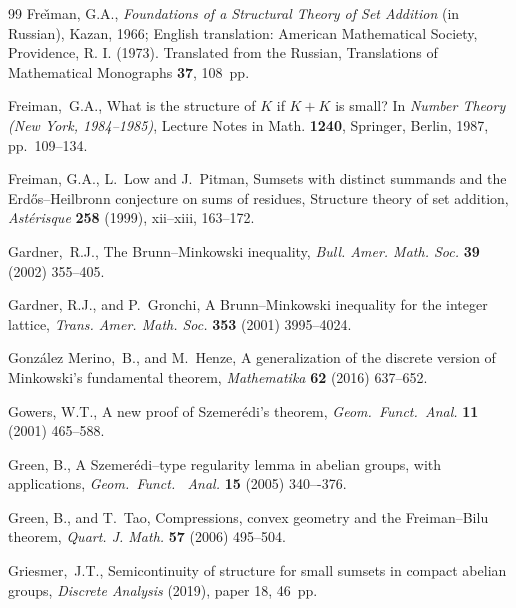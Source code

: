 \documentclass[12pt,reqno]{amsart}
\theoremstyle{definition}
\begin{document}
\begin{thebibliography}{99}
Fre\v{\i}man, G.A., {\em Foundations of a Structural Theory of Set Addition} (in Russian), Kazan, 1966; English translation: American Mathematical Society, Providence, R. I. (1973). Translated from the Russian, Translations of Mathematical Monographs {\bf 37}, 108~pp.

Freiman,~G.A.,
What is the structure of $K$ if $K+K$ is small? In {\em Number Theory (New York, 1984--1985)},
Lecture Notes in Math. {\bf 1240}, Springer, Berlin, 1987, pp.~109--134.

 Freiman, G.A., L.~Low and J.~Pitman, Sumsets with
distinct summands and the Erd\H{o}s--Heilbronn conjecture on sums of residues,
Structure theory of set addition, {\em Ast\'erisque} {\bf 258} (1999),
xii--xiii, 163--172.


Gardner,~R.J.,
The Brunn--Minkowski inequality,
{\em Bull. Amer. Math. Soc.} {\bf 39} (2002) 355--405.

Gardner, R.J., and P.~Gronchi,  A Brunn--Minkowski inequality for the integer lattice, {\em Trans. Amer. Math. Soc.} {\bf 353} (2001) 3995--4024.

Gonz\'alez Merino,~B., and  M.~Henze,
A generalization of the discrete version of Minkowski's fundamental theorem,
{\em Mathematika} {\bf 62} (2016) 637--652.

Gowers, W.T.,
A new proof of Szemer\'edi's theorem,
{\em Geom.~Funct.~Anal.} {\bf 11} (2001) 465--588.


Green, B.,  A Szemer\'edi--type regularity lemma in abelian groups, with applications,
{\em Geom.~Funct.~ Anal.} {\bf 15} (2005) 340–-376.




Green, B., and T.~Tao,
Compressions, convex geometry and the Freiman--Bilu theorem,
{\em Quart. J. Math.} {\bf 57} (2006)  495--504.


Griesmer,~J.T., Semicontinuity of structure for small sumsets in compact abelian groups,
{\em Discrete Analysis} (2019), paper 18, 46~pp.


\end{thebibliography}
\end{document}
